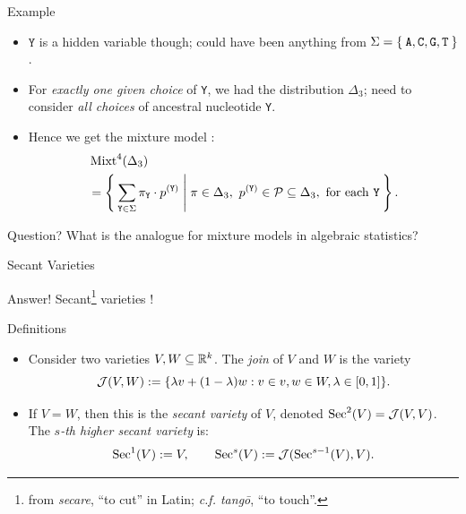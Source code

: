 \begin{frame}{Example}
    \begin{itemize}
        \item  $\texttt{Y}$ is a hidden variable though; could have been anything from $\Sigma = \Set{\texttt{A}, \texttt{C}, \texttt{G}, \texttt{T}}$.

        \item For \emph{exactly one given choice} of \texttt{Y}, we had the distribution $\Delta_{3}$; need to consider \emph{all choices} of ancestral nucleotide \texttt{Y}.

        \item Hence we get the mixture model \cite{EAsalmon}:
            \vspace*{-8pt}
        \begin{equation*}
            \begin{split}
                &\Mixt^{4}(\Delta_{3}) \\
                &= \Set{\sum_{ \texttt{Y} \in \Sigma  } \pi_{\texttt{Y}} \cdot p^{(\texttt{Y})} | \pi \in \Delta_{3},\ p^{(\texttt{Y})} \in \mc{P} \subseteq \Delta_{3}, \text{ for each \texttt{Y}} }.
            \end{split}
        \end{equation*}

    \end{itemize}

    \begin{block}{Question?}
    What is the analogue for mixture models in algebraic statistics?
    \end{block}

\end{frame}

\begin{frame}{Secant Varieties}
    \begin{block}{Answer!}
        Secant\footnote{from \emph{secare}, ``to cut'' in Latin; \emph{c.f. tangō}, ``to touch''.} varieties \cite{BSSSMD2009}!
    \end{block}

    \begin{block}{Definitions}
        \begin{itemize}
        \item Consider two varieties $V, W \subseteq \mathbb{R}^{k}$. The \emph{join} of $V$ and $W$ is the variety
        $$ \mathcal{J}(V,W) := \{ \lambda v + (1-\lambda)w : v \in v, w \in W, \lambda \in [0,1] \}. $$

        \item If $V = W$, then this is the \emph{secant variety} of $V$, denoted $\operatorname{Sec}^{2}(V) = \mathcal{J}(V,V)$. The \emph{$s$-th higher secant variety} is:
        $$ \operatorname{Sec}^{1}(V) := V, \qquad \operatorname{Sec}^{s}(V) := \mathcal{J}(\operatorname{Sec}^{s-1}(V), V ). $$
        \end{itemize}
    \end{block}

\end{frame}

